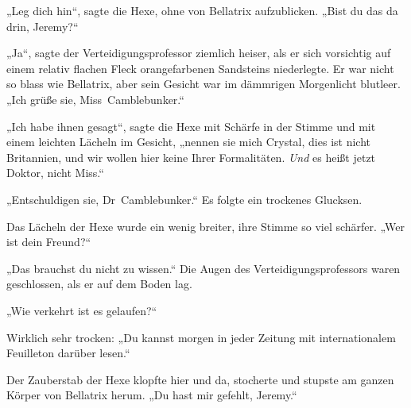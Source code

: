 „Leg dich hin“, sagte die Hexe, ohne von Bellatrix aufzublicken.
„Bist du das da drin, Jeremy?“

„Ja“, sagte der Verteidigungsprofessor ziemlich heiser, als er sich vorsichtig auf einem relativ flachen Fleck orangefarbenen Sandsteins niederlegte. Er war nicht so blass wie Bellatrix, aber sein Gesicht war im dämmrigen Morgenlicht blutleer.
„Ich grüße sie, Miss~Camblebunker.“

„Ich habe ihnen gesagt“, sagte die Hexe mit Schärfe in der Stimme und mit einem leichten Lächeln im Gesicht, „nennen sie mich Crystal, dies ist nicht Britannien, und wir wollen hier keine Ihrer Formalitäten. \emph{Und} es heißt jetzt Doktor, nicht Miss.“

„Entschuldigen sie, Dr~Camblebunker.“ Es folgte ein trockenes Glucksen.

Das Lächeln der Hexe wurde ein wenig breiter, ihre Stimme so viel schärfer.
„Wer ist dein Freund?“

„Das brauchst du nicht zu wissen.“ Die Augen des Verteidigungsprofessors waren geschlossen, als er auf dem Boden lag.

„Wie verkehrt ist es gelaufen?“

Wirklich sehr trocken:
„Du kannst morgen in jeder Zeitung mit internationalem Feuilleton darüber lesen.“

Der Zauberstab der Hexe klopfte hier und da, stocherte und stupste am ganzen Körper von Bellatrix herum.
„Du hast mir gefehlt, Jeremy.“

